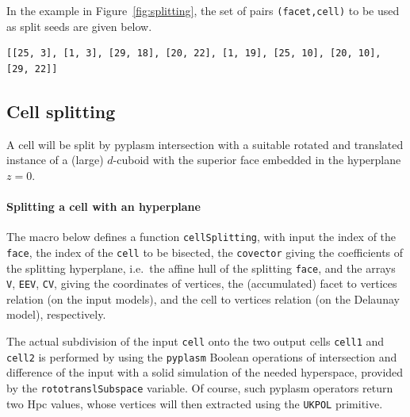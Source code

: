 \documentclass[11pt,oneside]{article}	%
\begin{document}
In the example in Figure~\ref{fig:splitting}, the set of pairs \texttt{(facet,cell)} to be used as split seeds are given below.
{\small
\begin{verbatim}
[[25, 3], [1, 3], [29, 18], [20, 22], [1, 19], [25, 10], [20, 10], [29, 22]]
\end{verbatim}}

\subsection{Cell splitting}

A cell will be split by pyplasm intersection with a suitable rotated and translated instance of a (large) $d$-cuboid with the superior face embedded in the hyperplane $z=0$.

\paragraph{Splitting a cell with an hyperplane}
The macro below defines a function \texttt{cellSplitting}, with input the index of the \texttt{face}, the index of the \texttt{cell} to be bisected, the \texttt{covector} giving the coefficients of the splitting hyperplane, i.e.~the affine hull of the splitting \texttt{face}, and the arrays \texttt{V}, \texttt{EEV}, \texttt{CV}, giving the coordinates of vertices, the (accumulated) facet to vertices relation (on the input models), and the cell to vertices relation (on the Delaunay model), respectively. 

The actual subdivision of the input \texttt{cell} onto the two output cells \texttt{cell1} and \texttt{cell2} is performed by using the \texttt{pyplasm} Boolean operations of intersection and difference of the input with a solid simulation of the needed hyperspace, provided by the \texttt{rototranslSubspace} variable. Of course, such pyplasm operators return two Hpc values, whose vertices will then extracted using the \texttt{UKPOL} primitive.
\end{document}
